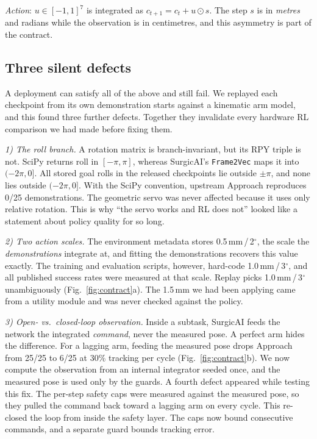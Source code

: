 \documentclass[letterpaper, 10 pt, conference]{ieeeconf}  %
\begin{document}
\emph{Action}: $u\in[-1,1]^7$ is integrated as
$c_{t+1}=c_t+u\odot s$. The step $s$ is in \emph{metres} and radians while the
observation is in centimetres, and this asymmetry is part of the contract.

\subsection{Three silent defects}
A deployment can satisfy all of the above and still fail. We replayed each
checkpoint from its own demonstration starts against a kinematic arm model, and
this found three further defects. Together they invalidate every hardware RL
comparison we had made before fixing them.

\emph{1) The roll branch.} A rotation matrix is branch-invariant, but its RPY
triple is not. SciPy returns roll in $[-\pi,\pi]$, whereas SurgicAI's
\texttt{Frame2Vec} maps it into $(-2\pi,0]$. All stored goal rolls in the
released checkpoints lie outside $\pm\pi$, and none lies outside $(-2\pi,0]$.
With the SciPy convention, upstream Approach reproduces 0/25 demonstrations.
The geometric servo was never affected because it uses only relative
rotation. This is why ``the servo works and RL does not'' looked like a
statement about policy quality for so long.

\emph{2) Two action scales.} The environment metadata stores 0.5\,mm\,/\,2$^\circ$,
the scale the \emph{demonstrations} integrate at, and fitting the
demonstrations recovers this value exactly. The training and evaluation scripts,
however, hard-code 1.0\,mm\,/\,3$^\circ$, and all published success rates were
measured at that scale. Replay picks 1.0\,mm\,/\,3$^\circ$ unambiguously
(Fig.~\ref{fig:contract}a). The 1.5\,mm we had been applying came from a
utility module and was never checked against the policy.

\emph{3) Open- vs.\ closed-loop observation.} Inside a subtask, SurgicAI feeds
the network the integrated \emph{command}, never the measured pose. A perfect
arm hides the difference. For a lagging arm, feeding the measured pose drops
Approach from 25/25 to 6/25 at 30\% tracking per cycle
(Fig.~\ref{fig:contract}b). We now compute the observation from an internal
integrator seeded once, and the measured pose is used only by the guards. A
fourth defect appeared while testing this fix. The per-step safety caps were
measured against the measured pose, so they pulled the command back toward a
lagging arm on every cycle. This re-closed the loop from inside the safety
layer. The caps now bound consecutive commands, and a separate guard bounds
tracking error.
\end{document}
